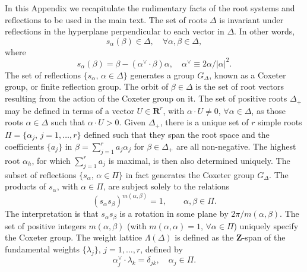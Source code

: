 \documentclass[a4paper,12pt]{article}
\begin{document}
In this Appendix we recapitulate the rudimentary facts of the root systems
and
reflections to be used in the main text.
The set of roots \(\Delta\) is invariant under reflections
in the hyperplane perpendicular to each
vector in \(\Delta\).  In other words,
\begin{equation}
   s_{\alpha}(\beta)\in\Delta,\quad\forall \alpha,\beta\in\Delta,
\end{equation}
where
\begin{equation}
   \label{Root_reflection}
   s_{\alpha}(\beta)=\beta-(\alpha^{\vee}\!\!\cdot\beta)\alpha,
\quad \alpha^{\vee}\equiv2\alpha/|\alpha|^{2}.
\end{equation}
The set of reflections \(\{s_{\alpha},\,\alpha\in\Delta\}\) generates a
group \(G_{\Delta}\), known as a Coxeter group, or finite reflection group.
The orbit of \(\beta\in\Delta\) is the set of root vectors
resulting from the action of the Coxeter group on it.
The set of positive roots \(\Delta_{+}\) may be defined in terms of a
vector \(U\in\mathbf{R}^{r}\), with
\(\alpha\cdot U \neq 0,\,\forall\alpha\in\Delta\), as
those roots \(\alpha\in\Delta\) such that \(\alpha\cdot U>0\).  Given
\(\Delta_{+}\), there is a unique
set of \(r\) simple roots \(\Pi = \{\alpha_{j},\,j=1,\ldots, r\}\)
defined such that they span
the root space and the coefficients \(\{a_{j}\}\) in
\(\beta=\sum_{j=1}^{r}a_{j}\alpha_{j}\) for \(\beta\in\Delta_{+}\)
are all non-negative. The highest root  \(\alpha_h\), for which
\(\sum_{j=1}^{r}a_{j}\) is maximal, is then also determined
uniquely.
The subset of reflections \(\{s_{\alpha},\,\alpha\in\Pi\}\)
in fact generates the
Coxeter group \(G_{\Delta}\).  The products of
\(s_{\alpha}\), with \(\alpha\in \Pi\), are subject solely to the relations
\begin{equation}
   \label{Coxeter_relations}
   (s_{\alpha}s_{\beta})^{m(\alpha,\beta)}=1,\qquad \alpha,\beta\in \Pi.
\end{equation}
The interpretation is that \(s_{\alpha}s_{\beta}\) is a rotation in some
plane by \(2\pi/{m(\alpha,\beta)}\).
The set of positive integers \(m(\alpha,\beta)\)
(with \(m(\alpha,\alpha)=1,\,\forall \alpha\in \Pi\))
uniquely specify the Coxeter group.
The weight lattice \(\Lambda(\Delta)\) is defined as the \(\mathbf{Z}\)-span
of the fundamental weights \(\{\lambda_j\}\), \(j=1,\ldots,r\), defined
by
\begin{equation}
   \alpha^{\vee}_j\!\!\cdot\lambda_k=\delta_{jk},\quad \alpha_j\in\Pi.
\end{equation}
\end{document}

